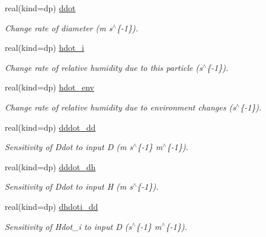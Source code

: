 \begin{DoxyCompactItemize}
\item 
real(kind=dp) \mbox{\hyperlink{structpmc__condense_1_1condense__rates__outputs__t_a4e63e54ec12d561c3293ea43e09bfa97}{ddot}}
\begin{DoxyCompactList}\small\item\em Change rate of diameter (m s$^\wedge$\{-\/1\}). \end{DoxyCompactList}\item 
real(kind=dp) \mbox{\hyperlink{structpmc__condense_1_1condense__rates__outputs__t_a933a8c0491e70d1cdc9f1a5897a5c907}{hdot\+\_\+i}}
\begin{DoxyCompactList}\small\item\em Change rate of relative humidity due to this particle (s$^\wedge$\{-\/1\}). \end{DoxyCompactList}\item 
real(kind=dp) \mbox{\hyperlink{structpmc__condense_1_1condense__rates__outputs__t_a173e20f7d692239da0ecc674648afb7b}{hdot\+\_\+env}}
\begin{DoxyCompactList}\small\item\em Change rate of relative humidity due to environment changes (s$^\wedge$\{-\/1\}). \end{DoxyCompactList}\item 
real(kind=dp) \mbox{\hyperlink{structpmc__condense_1_1condense__rates__outputs__t_a7134cf56f816d3cff9812f9d54b99744}{dddot\+\_\+dd}}
\begin{DoxyCompactList}\small\item\em Sensitivity of {\ttfamily Ddot} to input {\ttfamily D} (m s$^\wedge$\{-\/1\} m$^\wedge$\{-\/1\}). \end{DoxyCompactList}\item 
real(kind=dp) \mbox{\hyperlink{structpmc__condense_1_1condense__rates__outputs__t_a7385957933e04f2fdab52791b4b85c56}{dddot\+\_\+dh}}
\begin{DoxyCompactList}\small\item\em Sensitivity of {\ttfamily Ddot} to input {\ttfamily H} (m s$^\wedge$\{-\/1\}). \end{DoxyCompactList}\item 
real(kind=dp) \mbox{\hyperlink{structpmc__condense_1_1condense__rates__outputs__t_a1f624977e3fb49feeaa27e17824638c4}{dhdoti\+\_\+dd}}
\begin{DoxyCompactList}\small\item\em Sensitivity of {\ttfamily Hdot\+\_\+i} to input {\ttfamily D} (s$^\wedge$\{-\/1\} m$^\wedge$\{-\/1\}). \end{DoxyCompactList}\item 

\end{DoxyCompactItemize}
